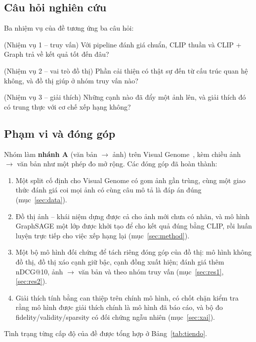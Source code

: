 \documentclass[12pt, a4paper]{article}
\begin{document}
\subsection{Câu hỏi nghiên cứu}
Ba nhiệm vụ của đề tương ứng ba câu hỏi:
\begin{description}[leftmargin=1.2cm,style=nextline]
\item[RQ1] (Nhiệm vụ 1 -- truy vấn) Với pipeline đánh giá chuẩn, CLIP thuần và CLIP + Graph trả về kết quả tốt đến đâu?
\item[RQ2] (Nhiệm vụ 2 -- vai trò đồ thị) Phần cải thiện có thật sự đến từ cấu trúc quan hệ không, và đồ thị giúp ở nhóm truy vấn nào?
\item[RQ3] (Nhiệm vụ 3 -- giải thích) Những cạnh nào đã đẩy một ảnh lên, và giải thích đó có trung thực với cơ chế xếp hạng không?
\end{description}

\subsection{Phạm vi và đóng góp}
Nhóm làm \textbf{nhánh A} (văn bản $\to$ ảnh) trên Visual Genome~\cite{krishna2017vg}, kèm chiều ảnh $\to$ văn bản như một phép đo mở rộng. Các đóng góp đã hoàn thành:
\begin{enumerate}
\item Một split cố định cho Visual Genome có gom ảnh gần trùng, cùng một giao thức đánh giá coi mọi ảnh có cùng câu mô tả là đáp án đúng (mục~\ref{sec:data}).
\item Đồ thị ảnh -- khái niệm dựng được cả cho ảnh mới chưa có nhãn, và mô hình GraphSAGE một lớp được khởi tạo để cho kết quả đúng bằng CLIP, rồi huấn luyện trực tiếp cho việc xếp hạng lại (mục~\ref{sec:method}).
\item Một bộ mô hình đối chứng để tách riêng đóng góp của đồ thị: mô hình không đồ thị, đồ thị xáo cạnh giữ bậc, cạnh đồng xuất hiện; đánh giá thêm nDCG@10, ảnh $\to$ văn bản và theo nhóm truy vấn (mục~\ref{sec:res1}, \ref{sec:res2}).
\item Giải thích tính bằng can thiệp trên chính mô hình, có chốt chặn kiểm tra rằng mô hình được giải thích chính là mô hình đã báo cáo, và bộ đo fidelity/validity/sparsity có đối chứng ngẫu nhiên (mục~\ref{sec:xai}).
\end{enumerate}
Tình trạng từng cấp độ của đề được tổng hợp ở Bảng~\ref{tab:tiendo}.
\end{document}
